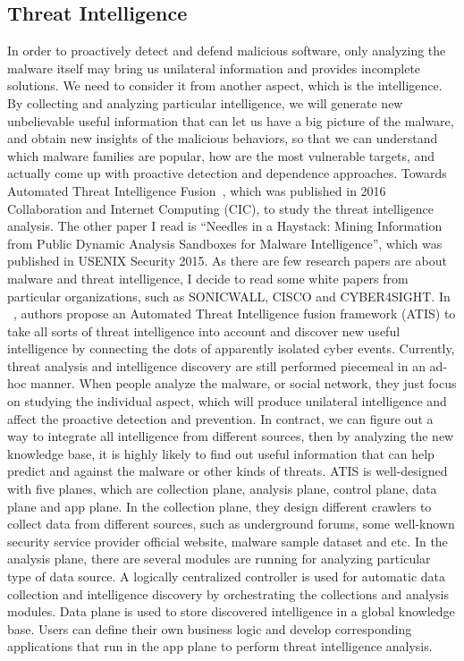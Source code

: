 \documentclass[11pt]{article}
\begin{document}
	\subsection{Threat Intelligence}
	In order to proactively detect and defend malicious software, only analyzing the malware itself may bring us unilateral information and provides incomplete solutions. We need to consider it from another aspect, which is the intelligence. By collecting and analyzing particular intelligence, we will generate new unbelievable useful information that can let us have a big picture of the malware, and obtain new insights of the malicious behaviors, so that we can understand which malware families are popular, how are the most vulnerable targets, and actually come up with proactive detection and dependence approaches.
	Towards Automated Threat Intelligence Fusion~\cite{moditowards}, which was published in 2016 Collaboration and Internet Computing (CIC), to study the threat intelligence analysis. The other paper I read is “Needles in a Haystack: Mining Information from Public Dynamic Analysis Sandboxes for Malware Intelligence”, which was published in USENIX Security 2015. As there are few research papers are about malware and threat intelligence, I decide to read some white papers from particular organizations, such as SONICWALL, CISCO and CYBER4SIGHT.
	In ~\cite{moditowards}, authors propose an Automated Threat Intelligence fusion framework (ATIS) to take all sorts of threat intelligence into account and discover new useful intelligence by connecting the dots of apparently isolated cyber events. 
	Currently, threat analysis and intelligence discovery are still performed piecemeal in an ad-hoc manner. When people analyze the malware, or social network, they just focus on studying the individual aspect, which will produce unilateral intelligence and affect the proactive detection and prevention. In contract, we can figure out a way to integrate all intelligence from different sources, then by analyzing the new knowledge base, it is highly likely to find out useful information that can help predict and against the malware or other kinds of threats. ATIS is well-designed with five planes, which are collection plane, analysis plane, control plane, data plane and app plane. In the collection plane, they design different crawlers to collect data from different sources, such as underground forums, some well-known security service provider official website, malware sample dataset and etc. In the analysis plane, there are several modules are running for analyzing particular type of data source. A logically centralized controller is used for automatic data collection and intelligence discovery by orchestrating the collections and analysis modules. Data plane is used to store discovered intelligence in a global knowledge base. Users can define their own business logic and develop corresponding applications that run in the app plane to perform threat intelligence analysis.
\end{document}
